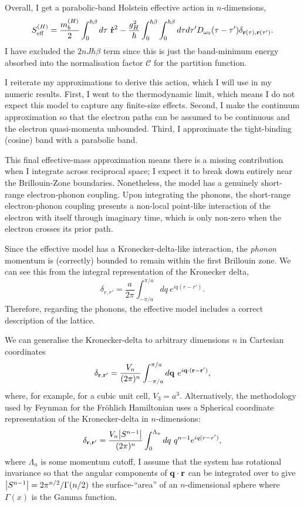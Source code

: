 Overall, I get a parabolic-band Holstein effective action in $n$-dimensions,
\begin{equation}
    S_{\text{eff}}^{(H)} = \frac{m^{(H)}_b}{2} \int_0^{\hbar\beta} d\tau\ \vb{\Dot{r}}^2 - \frac{g_H^2}{\hbar} \int_0^{\hbar\beta} \int_0^{\hbar\beta} d\tau d\tau' D_{\omega_0}(\tau - \tau') \delta_{\vb{r}(\tau), \vb{r}(\tau')} .
\end{equation}
I have excluded the $2nJ\hbar\beta$ term since this is just the band-minimum energy absorbed into the normalisation factor $\mathcal{C}$ for the partition function. 

I reiterate my approximations to derive this action, which I will use in my numeric results. First, I went to the thermodynamic limit, which means I do not expect this model to capture any finite-size effects. Second, I make the continuum approximation so that the electron paths can be assumed to be continuous and the electron quasi-momenta unbounded. Third, I approximate the tight-binding (cosine) band with a parabolic band. 

This final effective-mass approximation means there is a missing contribution when I integrate across reciprocal space; I expect it to
break down entirely near the Brillouin-Zone boundaries. Nonetheless, the model has a genuinely short-range electron-phonon coupling. Upon integrating the phonons, the short-range electron-phonon coupling presents a non-local point-like interaction of the electron with itself through imaginary time, which is only non-zero when the electron crosses its prior path.  

Since the effective model has a Kronecker-delta-like interaction, the \emph{phonon} momentum is (correctly) bounded to remain within the first Brillouin zone. We can see this from the integral representation of the Kronecker delta, 
\begin{equation}
    \delta _{r, r'} = \frac{a}{2\pi} \int_{-\pi/a}^{\pi/a} dq\ e^{i q (r - r')} .
\end{equation}
Therefore, regarding the phonons, the effective model includes a correct description of the lattice. 

We can generalise the Kronecker-delta to arbitrary dimensions $n$ in Cartesian coordinates 
\begin{equation}
    \delta_{\vb{r}, \vb{r'}} = \frac{V_n}{(2\pi)^n} \int_{-\pi/a}^{\pi/a} d\vb{q}\ e^{i \vb{q} \cdot (\vb{r} - \vb{r'})} ,
\end{equation}
where, for example, for a cubic unit cell, $V_3 = a^3$. Alternatively, the methodology used by Feynman for the Fr\"ohlich Hamiltonian uses a Spherical coordinate representation of the Kronecker-delta in $n$-dimensions:
\begin{equation}
    \delta_{\vb{r}, \vb{r'}} = \frac{V_n \abs{S^{n-1}}}{(2\pi)^n} \int_0^{\Lambda_n} dq\ q^{n-1} e^{i q (r - r')} ,
\end{equation}
where $\Lambda_n$ is some momentum cutoff, I assume that the system has rotational invariance so that the angular components of $\vb{q} \cdot \vb{r}$ can be integrated over to give $\abs{S^{n-1}} = 2\pi^{n/2} / \Gamma(n/2)$ the surface-``area'' of an $n$-dimensional sphere where $\Gamma(x)$ is the Gamma function.

